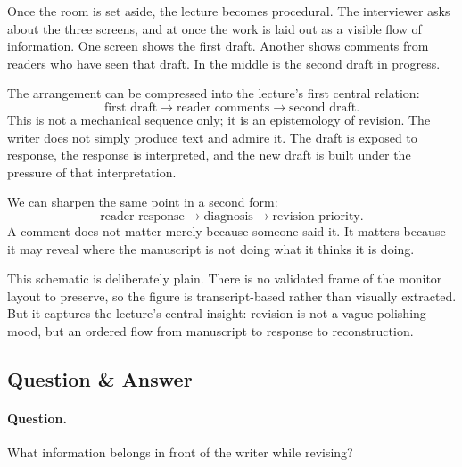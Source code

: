 Once the room is set aside, the lecture becomes procedural. The interviewer asks about the three screens, and at once the work is laid out as a visible flow of information. One screen shows the first draft. Another shows comments from readers who have seen that draft. In the middle is the second draft in progress.

The arrangement can be compressed into the lecture's first central relation:
\begin{equation}
\text{first draft} \to \text{reader comments} \to \text{second draft}.
\end{equation}
This is not a mechanical sequence only; it is an epistemology of revision. The writer does not simply produce text and admire it. The draft is exposed to response, the response is interpreted, and the new draft is built under the pressure of that interpretation.

We can sharpen the same point in a second form:
\begin{equation}
\text{reader response} \to \text{diagnosis} \to \text{revision priority}.
\end{equation}
A comment does not matter merely because someone said it. It matters because it may reveal where the manuscript is not doing what it thinks it is doing.

\begin{figure}[h]
\centering
{}
\end{figure}

This schematic is deliberately plain. There is no validated frame of the monitor layout to preserve, so the figure is transcript-based rather than visually extracted. But it captures the lecture's central insight: revision is not a vague polishing mood, but an ordered flow from manuscript to response to reconstruction.

\subsection{Question \& Answer}

\paragraph{Question.} What information belongs in front of the writer while revising?

